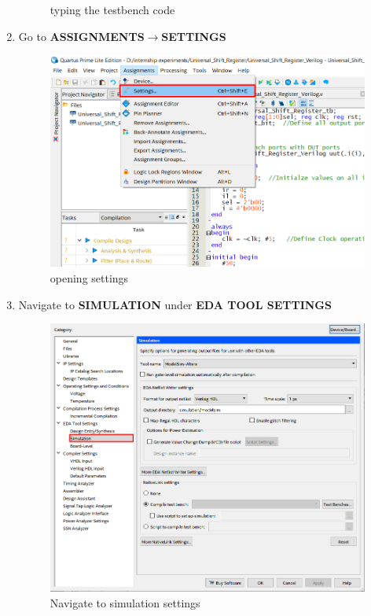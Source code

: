 \documentclass[12pt]{article}
\begin{document}
\begin{enumerate}
\begin{figure}[H]
        \caption{typing the testbench code}
    \end{figure}
    \item Go to \textbf{ASSIGNMENTS$\rightarrow$SETTINGS}
     \begin{figure}[H]
        \centering
         \includegraphics[scale=0.45]{usr11.png}
        \caption{opening settings}
    \end{figure}
    \item Navigate to \textbf{SIMULATION} under \textbf{EDA TOOL SETTINGS}
     \begin{figure}[H]
        \centering
         \includegraphics[scale=0.4]{implementing_modelsim/4.png}
        \caption{Navigate to simulation settings}

\end{figure}
\end{enumerate}
\end{document}
